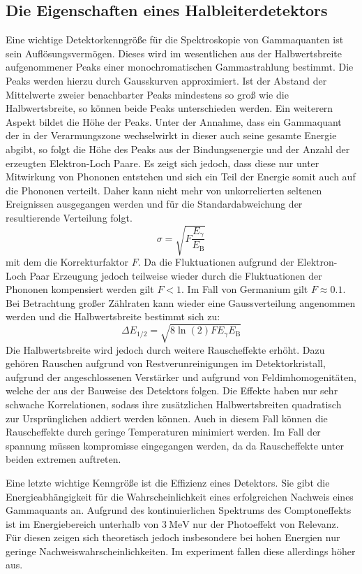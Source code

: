 \subsection{Die Eigenschaften eines Halbleiterdetektors}%
Eine wichtige Detektorkenngröße für die Spektroskopie von Gammaquanten ist sein Auflösungsvermögen. Dieses wird im wesentlichen aus der Halbwertsbreite aufgenommener Peaks einer monochromatischen Gammastrahlung bestimmt. Die Peaks werden hierzu durch Gausskurven approximiert. Ist der Abstand der Mittelwerte zweier benachbarter Peaks mindestens so groß wie die Halbwertsbreite, so können beide Peaks unterschieden werden. Ein weiterern Aspekt bildet die Höhe der Peaks. Unter der Annahme, dass ein Gammaquant der in der Verarmungszone wechselwirkt in dieser auch seine gesamte Energie abgibt, so folgt die Höhe des Peaks aus der Bindungsenergie und der Anzahl der erzeugten Elektron-Loch Paare. Es zeigt sich jedoch, dass diese nur unter Mitwirkung von Phononen entstehen und sich ein Teil der Energie somit auch auf die Phononen verteilt. Daher kann nicht mehr von unkorrelierten seltenen Ereignissen ausgegangen werden und für die Standardabweichung der resultierende Verteilung folgt.
\begin{equation}
\sigma = \sqrt{F \frac{E_\gamma}{E_\text{B}} }
\end{equation}
mit dem die Korrekturfaktor $F$. Da die Fluktuationen aufgrund der Elektron-Loch Paar Erzeugung jedoch teilweise wieder durch die Fluktuationen der Phononen kompensiert werden gilt $F < 1$. Im Fall von Germanium gilt $F \approx 0.1$. Bei Betrachtung großer Zählraten kann wieder eine Gaussverteilung angenommen werden und die Halbwertsbreite bestimmt sich zu:
\begin{equation}
\Delta E_\text{1/2} = \sqrt{8 \ln(2) F E_\gamma E_\text{B}}
\end{equation}
Die Halbwertsbreite wird jedoch durch weitere Rauscheffekte erhöht. Dazu gehören Rauschen aufgrund von Restverunreinigungen im Detektorkristall, aufgrund der angeschlossenen Verstärker und aufgrund von Feldimhomogenitäten, welche der aus der Bauweise des Detektors folgen. Die Effekte haben nur sehr schwache Korrelationen, sodass ihre zusätzlichen Halbwertsbreiten quadratisch zur Ursprünglichen addiert werden können. Auch in diesem Fall können die Rauscheffekte durch geringe Temperaturen minimiert werden. Im Fall der spannung müssen kompromisse eingegangen werden, da da Rauscheffekte unter beiden extremen auftreten.

Eine letzte wichtige Kenngröße ist die Effizienz eines Detektors. Sie gibt die Energieabhängigkeit für die Wahrscheinlichkeit eines erfolgreichen Nachweis eines Gammaquants an. Aufgrund des kontinuierlichen Spektrums des Comptoneffekts ist im Energiebereich unterhalb von $\SI{3}{\mega\electronvolt}$ nur der Photoeffekt von Relevanz. Für diesen zeigen sich theoretisch jedoch insbesondere bei hohen Energien nur geringe Nachweiswahrscheinlichkeiten. Im experiment fallen diese allerdings höher aus. 


